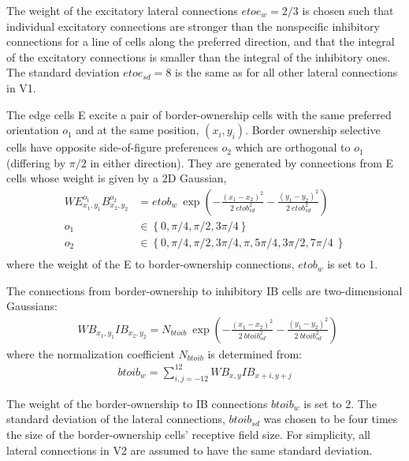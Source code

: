 The weight of the excitatory lateral connections $etoe_w=2/3$ is
chosen such that individual excitatory connections are stronger than
the nonspecific inhibitory connections for a line of cells along the
preferred direction, 
and that the integral of the excitatory connections is smaller than
the integral of the inhibitory ones. The standard deviation
$etoe_{sd}=8$ is the same as for all other lateral connections in V1.  

The edge cells E excite a pair of border-ownership cells with the same
preferred orientation $o_1$
and at the same position, $(x_i,y_i)$.  Border ownership selective
cells have opposite 
side-of-figure preferences
$o_2$ which are orthogonal to $o_1$
(\ie differing by $\pi/2$ in either direction).
They are generated by
connections from E cells whose  weight is given by  a 2D Gaussian, 
\begin{align}
	WE^{o_1}_{x_1,y_1}B^{o_2}_{x_2,y_2}&=etob_w \:	\exp\left(-\frac{(x_1-x_2)^2}{2\: etob_{sd} ^2}-\frac{(y_1-y_2)^2}{2\: etob_{sd} ^2}\right)\ \nonumber\\
	o_1&\in \left\{0,\pi/4,\pi/2,3\pi/4 \right\} \nonumber\\
	o_2&\in \left\{0,\pi/4,\pi/2,3\pi/4,\pi,5\pi/4,3\pi/2,7\pi/4\ \right\} \nonumber\\
\end{align}
where the weight of the E to border-ownership connections, $etob_w$ is set to 1.

The connections from border-ownership to inhibitory IB cells are two-dimensional Gaussians: 
\begin{align}
	&WB_{x_1,y_1}IB_{x_2,y_2}=N_{btoib}\: \exp\left(-\frac{(x_1-x_2)^2}{2\: btoib_{sd}^2}-\frac{(y_1-y_2)^2}{2\: btoib_{sd}^2}\right)\
\end{align}
where the normalization coefficient $N_{btoib}$ is determined from:
\begin{align}
	btoib_w = \sum^{12}_{i,j=-12} WB_{x,y}IB_{x+i,y+j}
\end{align}

The weight of the border-ownership to IB connections $btoib_w$ is set to 2. The standard deviation of the lateral connections,
$btoib_{sd}$ was chosen to be four times the size of the border-ownership cells' receptive field size. For simplicity, all lateral connections in V2 are assumed to have the same standard deviation.

